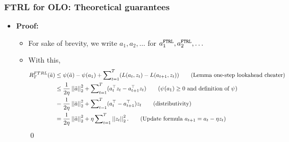 \begin{frame} 
	\frametitle{FTRL for OLO: Theoretical guarantees}
	\small
	\begin{itemize}
		\footnotesize
		
		\item \textbf{Proof:}
		\begin{itemize}\footnotesize
			
			 \item 	For sake of brevity, we write $a_1, a_2, \ldots$ for $a_1^{\texttt{FTRL}}, a_2^{\texttt{FTRL}}, \ldots$ 
			 \item With this,
			\begin{align*}
				R_T^{FTRL}(\tilde a) &\leq \reg(\tilde a) - \reg(a_1) + \sum\nolimits_{t=1}^T (\l(a_t,z_t) - \l(a_{t+1},z_t)) \tag{Lemma one-step lookahead cheater} \\
				 &\leq \frac{1}{2\eta}  \norm{\tilde a}^2 + \sum\nolimits_{t=1}^T ( a_t^\top z_t  -  a_{t+1}^\top z_t  ) \tag{$\reg(a_1)\geq 0$ and definition of $\reg$} \\
				 &= \frac{1}{2\eta}  \norm{\tilde a}^2 + \sum\nolimits_{t=1}^T  ( a_t^\top-  a_{t+1}^\top   )z_t \tag{distributivity} \\
				 &= \frac{1}{2\eta}  \norm{\tilde a}^2 + \eta \sum\nolimits_{t=1}^T   \norm{z_t}^2.  \tag{Update formula $	a_{t+1} = a_t - \eta z_t$}
			\end{align*}
			\qed
		\end{itemize}
%		
	\end{itemize}
\end{frame}

